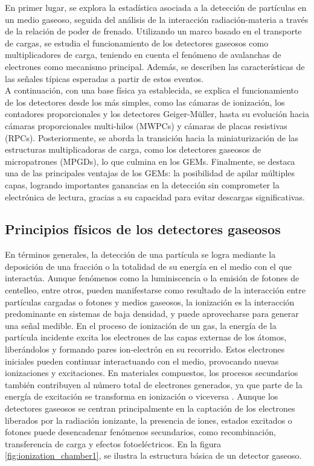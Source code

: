 \documentclass{article}
\begin{document}
\noindent En primer lugar, se explora la estadística asociada a la detección de partículas en un medio gaseoso, seguida del análisis de la interacción radiación-materia a través de la relación de poder de frenado. Utilizando un marco basado en el transporte de cargas, se estudia el funcionamiento de los detectores gaseosos como multiplicadores de carga, teniendo en cuenta el fenómeno de avalanchas de electrones como mecanismo principal. Además, se describen las características de las señales típicas esperadas a partir de estos eventos.\\

\noindent A continuación, con una base física ya establecida, se explica el funcionamiento de los detectores desde los más simples, como las cámaras de ionización, los contadores proporcionales y los detectores Geiger-Müller, hasta su evolución hacia cámaras proporcionales multi-hilos (MWPCs) y cámaras de placas resistivas (RPCs). Posteriormente, se aborda la transición hacia la miniaturización de las estructuras multiplicadoras de carga, como los detectores gaseosos de micropatrones (MPGDs), lo que culmina en los GEMs. Finalmente, se destaca una de las principales ventajas de los GEMs: la posibilidad de apilar múltiples capas, logrando importantes ganancias en la detección sin comprometer la electrónica de lectura, gracias a su capacidad para evitar descargas significativas.

\subsection{Principios físicos de los detectores gaseosos}

\noindent En términos generales, la detección de una partícula se logra mediante la deposición de una fracción o la totalidad de su energía en el medio con el que interactúa. Aunque fenómenos como la luminiscencia o la emisión de fotones de centelleo, entre otros, pueden manifestarse como resultado de la interacción entre partículas cargadas o fotones y medios gaseosos, la ionización es la interacción predominante en sistemas de baja densidad, y puede aprovecharse para generar una señal medible. En el proceso de ionización de un gas, la energía de la partícula incidente excita los electrones de las capas externas de los átomos, liberándolos y formando pares ion-electrón en su recorrido. Estos electrones iniciales pueden continuar interactuando con el medio, provocando nuevas ionizaciones y excitaciones. En materiales compuestos, los procesos secundarios también contribuyen al número total de electrones generados, ya que parte de la energía de excitación se transforma en ionización o viceversa \cite{kolanoski2020particle1}. Aunque los detectores gaseosos se centran principalmente en la captación de los electrones liberados por la radiación ionizante, la presencia de iones, estados excitados o fotones puede desencadenar fenómenos secundarios, como recombinación, transferencia de carga y efectos fotoeléctricos. En la figura \ref{fig:ionization_chamber1}, se ilustra la estructura básica de un detector gaseoso.
\end{document}
